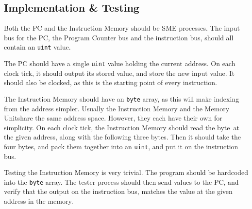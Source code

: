 \documentclass{beamer}
\begin{document}
\subsection{Implementation \& Testing}
\begin{frame}
    Both the PC and the Instruction Memory should be SME processes. The input
    bus for the PC, the Program Counter bus and the instruction bus, should all
    contain an \texttt{uint} value.

    \vspace{\baselineskip}
    The PC should have a single \texttt{uint} value holding the current
    address. On each clock tick, it should output its stored value, and store
    the new input value. It should also be clocked, as this is the starting
    point of every instruction.
\end{frame}
\begin{frame}
    The Instruction Memory should have an \texttt{byte} array, as this will
    make indexing from the address simpler. Usually the Instruction Memory and
    the Memory Unitshare the same address space. However, they each have their
    own for simplicity. On each clock tick, the Instruction Memory should read
    the byte at the given address, along with the following three bytes. Then
    it should take the four bytes, and pack them together into an
    \texttt{uint}, and put it on the instruction bus.
\end{frame}
\begin{frame}
    Testing the Instruction Memory is very trivial. The program should be
    hardcoded into the \texttt{byte} array. The tester process should then send
    values to the PC, and verify that the output on the instruction bus,
    matches the value at the given address in the memory.
\end{frame}
\end{document}
